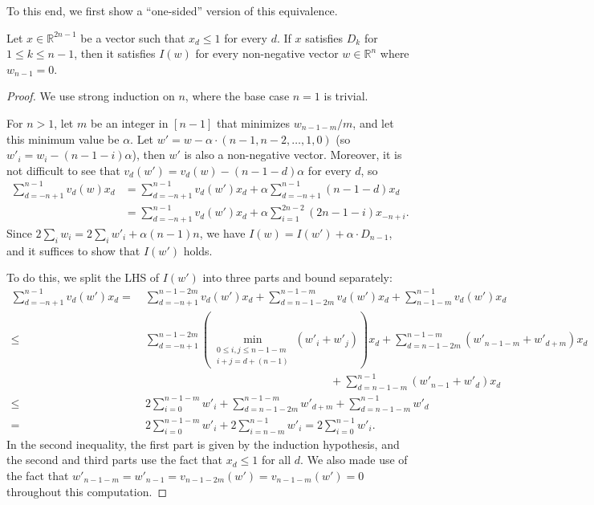 \documentclass[letterpaper,reqno,11pt]{amsart}
\begin{document}
To this end, we first show a ``one-sided'' version of this equivalence.

\begin{proposition}\label{prop:one-sided}
    Let $x\in \mathbb{R}^{2n-1}$ be a vector such that $x_d\leq 1$ for every $d$. If $x$ satisfies $D_k$ for $1\leq k\leq n-1$, then it satisfies $I(w)$ for every non-negative vector $w\in\mathbb{R}^{n}$ where $w_{n-1} = 0$.
\end{proposition}

\begin{proof}
    We use strong induction on $n$, where the base case $n = 1$ is trivial. 
    
    For $n > 1$, let $m$ be an integer in $[n-1]$ that minimizes $w_{n-1-m}/m$, and let this minimum value be $\alpha$. Let $w' = w - \alpha\cdot (n-1, n-2, \dots, 1, 0)$ (so $w'_i = w_i - (n-1-i)\alpha$), then $w'$ is also a non-negative vector. Moreover, it is not difficult to see that $v_d(w') = v_d(w) - (n-1-d)\alpha$ for every $d$, so 
    \begin{align*}
        \sum_{d=-n+1}^{n-1} v_d(w)x_d &= \sum_{d=-n+1}^{n-1} v_d(w')x_d + \alpha \sum_{d=-n+1}^{n-1} (n-1-d)x_d \\
        &=\sum_{d=-n+1}^{n-1} v_d(w')x_d + \alpha\sum_{i=1}^{2n-2} (2n-1-i)x_{-n+i}.
    \end{align*}
    Since $2\sum_{i} w_i = 2\sum_{i} w'_i + \alpha(n-1)n$, we have $I(w) = I(w') + \alpha\cdot D_{n-1}$, and it suffices to show that $I(w')$ holds. 
    
    To do this, we split the LHS of $I(w')$ into three parts and bound separately: \begin{align*}
        \sum_{d=-n+1}^{n-1} v_d(w') x_d =&\ \sum_{d=-n+1}^{n-1-2m} v_d(w')x_d + \sum_{d=n-1-2m}^{n-1-m} v_d(w')x_d + \sum_{n-1-m}^{n-1} v_d(w')x_d \\
        \leq&\ \sum_{d=-n+1}^{n-1-2m} \left(\min_{\substack{0\leq i, j\leq n-1-m\\ i+j=d+(n-1)}} (w'_i+w'_j)\right) x_d + \sum_{d=n-1-2m}^{n-1-m} (w'_{n-1-m}+w'_{d+m})x_d \\ &\hspace{7cm}+\sum_{d=n-1-m}^{n-1} (w'_{n-1}+w'_{d})x_d \\
        \leq&\ 2\sum_{i=0}^{n-1-m} w'_i + \sum_{d=n-1-2m}^{n-1-m} w'_{d+m} + \sum_{d=n-1-m}^{n-1} w'_d\\
        =&\ 2\sum_{i=0}^{n-1-m} w'_i + 2\sum_{i=n-m}^{n-1} w'_i = 2\sum_{i=0}^{n-1} w'_i.
    \end{align*}
    In the second inequality, the first part is given by the induction hypothesis, and the second and third parts use the fact that $x_d\leq 1$ for all $d$. We also made use of the fact that $w'_{n-1-m} = w'_{n-1} = v_{n-1-2m}(w')= v_{n-1-m}(w')=0$ throughout this computation.
\end{proof}
\end{document}
